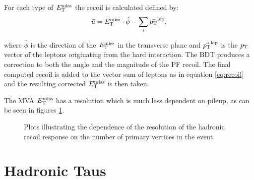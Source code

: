 For each type of $E_{\mathrm{T}}^{\text{miss}}$ the recoil is calculated defined by:
\begin{equation}
\vec{u} = E_{\mathrm{T}}^{\text{miss}} \cdot \hat{\phi} - \sum_{i}{ \vec{p_{\mathrm{T}}}^{\text{lep}}} ,
\label{eq:recoil}
\end{equation}

where $\hat{\phi}$ is the direction of the $E_{\mathrm{T}}^{\text{miss}}$ in the transverse plane and
$\vec{p_{\mathrm{T}}}^{\text{lep}}$ is the $p_{\mathrm{T}}$ vector of the leptons originating from the
hard interaction. The \ac{BDT} produces a correction to both the angle and the
magnitude of the \ac{PF} recoil. The final computed recoil is added to the
vector sum of leptons as in equation \ref{eq:recoil} and the resulting corrected
$E_{\mathrm{T}}^{\text{miss}}$ is then taken. 

The MVA $E_{\mathrm{T}}^{\text{miss}}$ has a resolution which is much less
dependent on pileup, as can be seen in figures \ref{fig:mvamet}.

\begin{figure}
\begin{center}
\end{center}
\caption{Plots illustrating the dependence of the resolution of the hadronic
recoil response on the number of primary vertices in the event.
}
\label{fig:mvamet}
\end{figure}

\section{Hadronic Taus}
\label{sec:taus}

